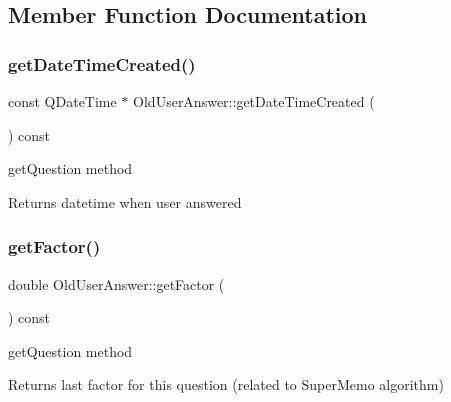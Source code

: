 \subsection{Member Function Documentation}
\mbox{\label{class_old_user_answer_aa731331582341ab7bce7d558d4c10ddd}} 
\subsubsection{\texorpdfstring{get\+Date\+Time\+Created()}{getDateTimeCreated()}}
{\footnotesize\ttfamily const Q\+Date\+Time $\ast$ Old\+User\+Answer\+::get\+Date\+Time\+Created (\begin{DoxyParamCaption}{ }\end{DoxyParamCaption}) const}



get\+Question method 

\begin{DoxyReturn}{Returns}
datetime when user answered 
\end{DoxyReturn}
\mbox{\label{class_old_user_answer_a2efbda41f588dee155655b9c1e99b63a}} 
\subsubsection{\texorpdfstring{get\+Factor()}{getFactor()}}
{\footnotesize\ttfamily double Old\+User\+Answer\+::get\+Factor (\begin{DoxyParamCaption}{ }\end{DoxyParamCaption}) const}



get\+Question method 

\begin{DoxyReturn}{Returns}
last factor for this question (related to Super\+Memo algorithm) 
\end{DoxyReturn}
\mbox{\label{class_old_user_answer_ac5a1402d4a962a5001493fdb3c30a287}} 
